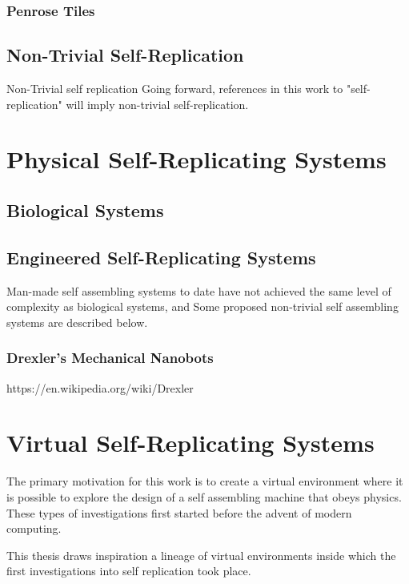 {\subsubsection{Penrose Tiles}

\cite{Penrose1958}

\subsection{Non-Trivial Self-Replication}

Non-Trivial self replication
Going forward, references in this work to "self-replication" will imply non-trivial self-replication.

\section{Physical Self-Replicating Systems}

\subsection{Biological Systems}

\subsection{Engineered Self-Replicating Systems}

Man-made self assembling systems to date have not achieved the same level of complexity as biological systems, and 
Some proposed non-trivial self assembling systems are described below.

\subsubsection{Drexler's Mechanical Nanobots}

https://en.wikipedia.org/wiki/Drexler%

\section{Virtual Self-Replicating Systems}

The primary motivation for this work is to create a virtual environment where it is possible to explore the design of a self assembling machine that obeys physics.  These types of investigations first started before the advent of modern computing.

This thesis draws inspiration a lineage of virtual environments inside which the first investigations into self replication took place.\\

}
